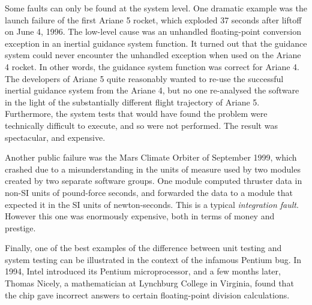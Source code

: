 


Some faults can only be found at the system level. One dramatic example was the
launch failure of the first Ariane 5 rocket, which exploded 37 seconds after
liftoff on June 4, 1996. The low-level cause was an unhandled floating-point
conversion exception in an inertial guidance system function. It turned out that
the guidance system could never encounter the unhandled exception when used on
the Ariane 4 rocket. In other words, the guidance system function was correct
for Ariane 4. The developers of Ariane 5 quite reasonably wanted to re-use the
successful inertial guidance system from the Ariane 4, but no one re-analysed
the software in the light of the substantially different flight trajectory of
Ariane 5. Furthermore, the system tests that would have found the problem were
technically difficult to execute, and so were not performed. The result was
spectacular, and expensive.



Another public failure was the Mars Climate Orbiter of September 1999, which
crashed due to a misunderstanding in the units of measure used by two modules
created by two separate software groups. One module computed thruster data in
non-SI units of pound-force seconds, and forwarded the data to a module that 
expected it in the SI units of newton-seconds. This is a typical {\it
integration fault}. However this one was enormously expensive, both in terms of
money and prestige.


Finally, one of the best examples of the difference between unit testing and
system testing can be illustrated in the context of the infamous Pentium bug. In
1994, Intel introduced its Pentium microprocessor, and a few months later,
Thomas Nicely, a mathematician at Lynchburg College in Virginia, found that the
chip gave incorrect answers to certain floating-point division calculations. 


